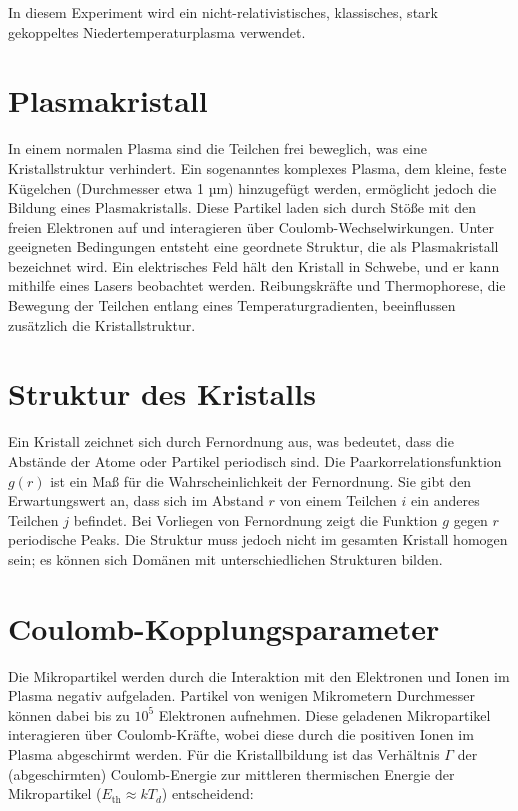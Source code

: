\documentclass[12pt,a4paper,ngerman]{report}
\begin{document}
In diesem Experiment wird ein nicht-relativistisches, klassisches, stark gekoppeltes Niedertemperaturplasma verwendet.

\section{Plasmakristall}
In einem normalen Plasma sind die Teilchen frei beweglich, was eine Kristallstruktur verhindert. Ein sogenanntes komplexes Plasma, dem kleine, feste Kügelchen (Durchmesser etwa 1 µm) hinzugefügt werden, ermöglicht jedoch die Bildung eines Plasmakristalls. Diese Partikel laden sich durch Stöße mit den freien Elektronen auf und interagieren über Coulomb-Wechselwirkungen. Unter geeigneten Bedingungen entsteht eine geordnete Struktur, die als Plasmakristall bezeichnet wird. Ein elektrisches Feld hält den Kristall in Schwebe, und er kann mithilfe eines Lasers beobachtet werden. Reibungskräfte und Thermophorese, die Bewegung der Teilchen entlang eines Temperaturgradienten, beeinflussen zusätzlich die Kristallstruktur.

\section{Struktur des Kristalls}
Ein Kristall zeichnet sich durch Fernordnung aus, was bedeutet, dass die Abstände der Atome oder Partikel periodisch sind. Die Paarkorrelationsfunktion \( g(r) \) ist ein Maß für die Wahrscheinlichkeit der Fernordnung. Sie gibt den Erwartungswert an, dass sich im Abstand \( r \) von einem Teilchen \( i \) ein anderes Teilchen \( j \) befindet. Bei Vorliegen von Fernordnung zeigt die Funktion \( g \) gegen \( r \) periodische Peaks. Die Struktur muss jedoch nicht im gesamten Kristall homogen sein; es können sich Domänen mit unterschiedlichen Strukturen bilden.

\section{Coulomb-Kopplungsparameter}
Die Mikropartikel werden durch die Interaktion mit den Elektronen und Ionen im Plasma negativ aufgeladen. Partikel von wenigen Mikrometern Durchmesser können dabei bis zu \(10^5\) Elektronen aufnehmen. Diese geladenen Mikropartikel interagieren über Coulomb-Kräfte, wobei diese durch die positiven Ionen im Plasma abgeschirmt werden. Für die Kristallbildung ist das Verhältnis \( \Gamma \) der (abgeschirmten) Coulomb-Energie zur mittleren thermischen Energie der Mikropartikel (\(E_{\text{th}} \approx kT_d\)) entscheidend:
\end{document}
